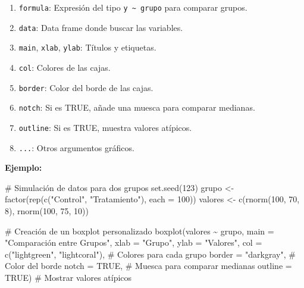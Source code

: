 \documentclass[
  spanish,
  a4paper,
  DIV=11,
  numbers=noendperiod,
  onepage,
  openany]{scrreprt}
\newenvironment{Shaded}{\begin{snugshade}}{\end{snugshade}}
\newcommand{\AttributeTok}[1]{\textcolor[rgb]{0.40,0.45,0.13}{#1}}
\newcommand{\CommentTok}[1]{\textcolor[rgb]{0.37,0.37,0.37}{#1}}
\newcommand{\ConstantTok}[1]{\textcolor[rgb]{0.56,0.35,0.01}{#1}}
\newcommand{\DecValTok}[1]{\textcolor[rgb]{0.68,0.00,0.00}{#1}}
\newcommand{\FunctionTok}[1]{\textcolor[rgb]{0.28,0.35,0.67}{#1}}
\newcommand{\NormalTok}[1]{\textcolor[rgb]{0.00,0.23,0.31}{#1}}
\newcommand{\OtherTok}[1]{\textcolor[rgb]{0.00,0.23,0.31}{#1}}
\newcommand{\SpecialCharTok}[1]{\textcolor[rgb]{0.37,0.37,0.37}{#1}}
\newcommand{\StringTok}[1]{\textcolor[rgb]{0.13,0.47,0.30}{#1}}
\begin{document}
\begin{enumerate}
\def\labelenumi{\arabic{enumi}.}
\item
  \texttt{formula}: Expresión del tipo
  \texttt{y\ \textasciitilde{}\ grupo} para comparar grupos.
\item
  \texttt{data}: Data frame donde buscar las variables.
\item
  \texttt{main}, \texttt{xlab}, \texttt{ylab}: Títulos y etiquetas.
\item
  \texttt{col}: Colores de las cajas.
\item
  \texttt{border}: Color del borde de las cajas.
\item
  \texttt{notch}: Si es TRUE, añade una muesca para comparar medianas.
\item
  \texttt{outline}: Si es TRUE, muestra valores atípicos.
\item
  \texttt{...}: Otros argumentos gráficos.
\end{enumerate}

\textbf{Ejemplo:}

\begin{Shaded}
\begin{Highlighting}[]
\CommentTok{\# Simulación de datos para dos grupos}
\FunctionTok{set.seed}\NormalTok{(}\DecValTok{123}\NormalTok{)}
\NormalTok{grupo }\OtherTok{\textless{}{-}} \FunctionTok{factor}\NormalTok{(}\FunctionTok{rep}\NormalTok{(}\FunctionTok{c}\NormalTok{(}\StringTok{"Control"}\NormalTok{, }\StringTok{"Tratamiento"}\NormalTok{), }\AttributeTok{each =} \DecValTok{100}\NormalTok{))}
\NormalTok{valores }\OtherTok{\textless{}{-}} \FunctionTok{c}\NormalTok{(}\FunctionTok{rnorm}\NormalTok{(}\DecValTok{100}\NormalTok{, }\DecValTok{70}\NormalTok{, }\DecValTok{8}\NormalTok{), }\FunctionTok{rnorm}\NormalTok{(}\DecValTok{100}\NormalTok{, }\DecValTok{75}\NormalTok{, }\DecValTok{10}\NormalTok{))}

\CommentTok{\# Creación de un boxplot personalizado}
\FunctionTok{boxplot}\NormalTok{(valores }\SpecialCharTok{\textasciitilde{}}\NormalTok{ grupo,}
        \AttributeTok{main =} \StringTok{"Comparación entre Grupos"}\NormalTok{,}
        \AttributeTok{xlab =} \StringTok{"Grupo"}\NormalTok{,}
        \AttributeTok{ylab =} \StringTok{"Valores"}\NormalTok{,}
        \AttributeTok{col =} \FunctionTok{c}\NormalTok{(}\StringTok{"lightgreen"}\NormalTok{, }\StringTok{"lightcoral"}\NormalTok{), }\CommentTok{\# Colores para cada grupo}
        \AttributeTok{border =} \StringTok{"darkgray"}\NormalTok{,          }\CommentTok{\# Color del borde}
        \AttributeTok{notch =} \ConstantTok{TRUE}\NormalTok{,                 }\CommentTok{\# Muesca para comparar medianas}
        \AttributeTok{outline =} \ConstantTok{TRUE}\NormalTok{)               }\CommentTok{\# Mostrar valores atípicos}
\end{Highlighting}
\end{Shaded}
\end{document}
